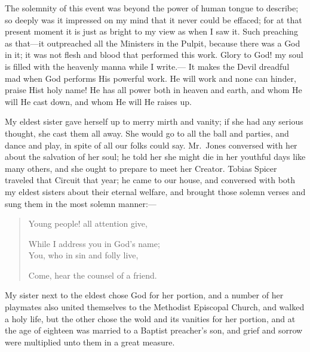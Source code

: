 \documentclass{article}
\renewcommand\footnote[1]{} %
\begin{document}
The solemnity of this event was beyond the power of human tongue to describe; so deeply was it impressed on my mind that it never could be effaced; for at that present moment it is just as bright to my view as when I saw it.
Such preaching as that---it outpreached all the Ministers in the Pulpit, because there was a God in it; it was not flesh and blood that performed this work.
Glory to God! my soul is filled with the heavenly manna while I write.---
It makes the Devil dreadful mad when God performs His powerful work.
He will work and none can hinder, praise Hist holy name!
He has all power both in heaven and earth, and whom He will He cast down, and whom He will He raises up.

My eldest sister\footnote{Harriet} gave herself up to merry mirth and vanity; if she had any serious thought, she cast them all away.
She would go to all the ball and parties, and dance and play, in spite of all our folks could say.
Mr.\ Jones conversed with her about the salvation of her soul; he told her she might die in her youthful days like many others, and she ought to prepare to meet her Creator.
Tobias Spicer traveled that Circuit that year; he came to our house, and conversed with both my eldest sisters about their eternal welfare, and brought those solemn verses and sung them in the most solemn manner:---
\begin{quote}
\setlength{\parindent}{2ex}
\setlength{\parskip}{0}
    Young people! all attention give,
    \par While I address you in God's name;\\
    You, who in sin and folly live,
    \par Come, hear the counsel of a friend.
\end{quote}

My sister next to the eldest\footnote{Maria} chose God for her portion, and a number of her playmates also united themselves to the Methodist Episcopal Church, and walked a holy life, but the other\footnote{Harriet} chose the wold and its vanities for her portion, and at the age of eighteen\footnote{in the year 1814} was married to a Baptist preacher's son\footnote{Joseph Perkins}, and grief and sorrow were multiplied unto them in a great measure.
\end{document}
